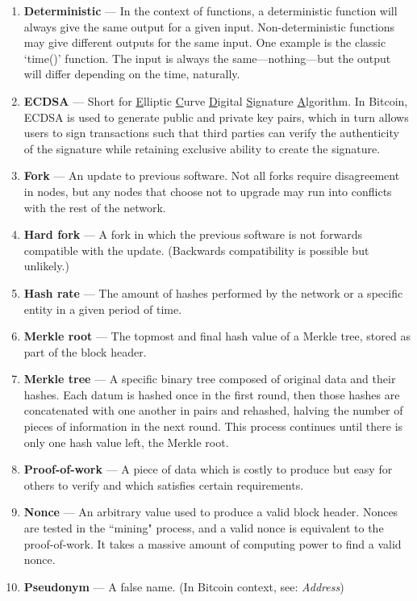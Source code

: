 \documentclass[full.tex]{subfiles}
\begin{document}
\begin{enumerate}
        \item \textbf{Deterministic} --- In the context of functions, a deterministic function will always give the same output for a given input. Non-deterministic functions may give different outputs for the same input. One example is the classic `time()' function. The input is always the same---nothing---but the output will differ depending on the time, naturally.
        \item \textbf{ECDSA} --- Short for \underline{E}lliptic \underline{C}urve \underline{D}igital \underline{S}ignature \underline{A}lgorithm. In Bitcoin, ECDSA is used to generate public and private key pairs, which in turn allows users to sign transactions such that third parties can verify the authenticity of the signature while retaining exclusive ability to create the signature.
        \newpage
        \item \textbf{Fork} --- An update to previous software. Not all forks require disagreement in nodes, but any nodes that choose not to upgrade may run into conflicts with the rest of the network.
        \item \textbf{Hard fork} --- A fork in which the previous software is not forwards compatible with the update. (Backwards compatibility is possible but unlikely.)
        \item \textbf{Hash rate} --- The amount of hashes performed by the network or a specific entity in a given period of time.
        \item \textbf{Merkle root} --- The topmost and final hash value of a Merkle tree, stored as part of the block header.
        \item \textbf{Merkle tree} --- A specific binary tree composed of original data and their hashes. Each datum is hashed once in the first round, then those hashes are concatenated with one another in pairs and rehashed, halving the number of pieces of information in the next round. This process continues until there is only one hash value left, the Merkle root.
        \item \textbf{Proof-of-work} --- A piece of data which is costly to produce but easy for others to verify and which satisfies certain requirements.
        \item \textbf{Nonce} --- An arbitrary value used to produce a valid block header. Nonces are tested in the ``mining" process, and a valid nonce is equivalent to the proof-of-work. It takes a massive amount of computing power to find a valid nonce.
        \item \textbf{Pseudonym} --- A false name. (In Bitcoin context, see: \textit{Address})

\end{enumerate}
\end{document}
